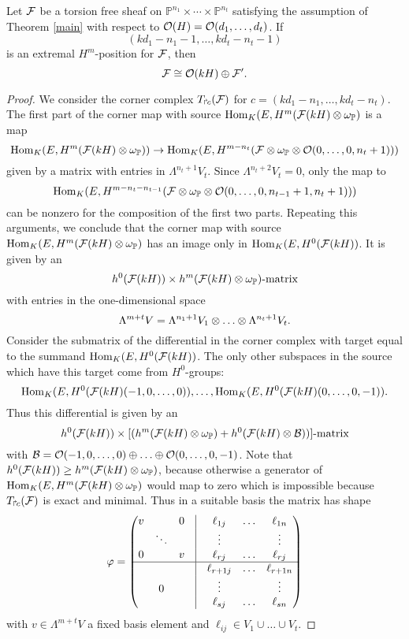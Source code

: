 \documentclass[twoside,12pt, leqno]{article}
\def\PP{{\mathbb P}}
\def\PPn{{\PP^{n_1} \times \cdots  \times \PP^{n_t}}}
\begin{document}
\begin{proposition}\label{summand}  Let ${\mathcal F}$ be a torsion free sheaf on $\PPn$ satisfying the assumption of Theorem \ref{main} with respect to
${\mathcal O}(H) = {\mathcal O}(d_1,\ldots,d_t)$. If $$(kd_1-n_1-1,\ldots,kd_t-n_t-1)$$ is an extremal $H^m$-position for ${\mathcal F}$, then
$$ {\mathcal F}\cong {\mathcal O}(kH) \oplus {\mathcal F}'.$$
\end{proposition}

\begin{proof}  We consider the corner complex $T_{\Rsh \kern -1pt c}({\mathcal F})$ for $c=(kd_1-n_1,\ldots,kd_t-n_t)$. The first part of the corner map
with source $\Hom_K(E,H^m(\sF(kH) \tensor \omega_\PP)$ is a map
$$
\Hom_K(E,H^m(\sF(kH) \tensor \omega_\PP)) \to \Hom_K(E,H^{m-n_t}(\sF\tensor \omega_\PP \tensor \sO(0,\ldots,0,n_t+1)))
$$
given by a matrix with entries in $\Lambda^{n_t+1} V_t$. Since $\Lambda^{n_t+2} V_t=0$, only the map to
$$
 \Hom_K(E,H^{m-n_t-n_{t-1}}(\sF\tensor \omega_\PP \tensor \sO(0,\ldots,0,n_{t-1}+1,n_t+1)))
$$
can be nonzero for the composition of the first two parts. Repeating this arguments, we conclude that the corner map with source 
$\Hom_K(E,H^m(\sF(kH) \tensor \omega_\PP)$ has an image only in $\operatorname{Hom}_K(E,H^0({\mathcal F}(kH))$. 
It is given by an
$$h^0(\sF(kH)) \times h^m(\sF(kH) \tensor \omega_\PP)\hbox{-matrix}$$ with entries in the one-dimensional space
$$\Lambda^{m+t} V =\Lambda^{n_1+1} V_1 \otimes \ldots \otimes \Lambda^{n_t+1} V_t.$$
Consider the submatrix of the differential in the corner complex with target equal to the summand $\operatorname{Hom}_K(E,H^0({\mathcal F}(kH))$. 
The only other subspaces in the source which have this target come from $H^0$-groups:
$$\operatorname{Hom}_K(E,H^0({\mathcal F}(kH)(-1,0,\ldots,0)), \ldots, \operatorname{Hom}_K(E,H^0({\mathcal F}(kH)(0,\ldots,0,-1)).$$
Thus this differential is given by an
$$h^0(\sF(kH)) \times [(h^m(\sF(kH)\tensor \omega_\PP) + h^0(\sF(kH)\otimes \sB) ) ]\hbox{-matrix} $$
with ${\mathcal B}= {\mathcal O}(-1,0,\ldots,0) \oplus \ldots \oplus {\mathcal O}(0,\ldots,0,-1)$.
Note that $h^0(\sF(kH)) \ge h^m(\sF(kH)\tensor \omega_\PP)$, because otherwise a generator of 
$\Hom_K(E,H^m(\sF(kH) \tensor \omega_\PP)$ would map to zero which is impossible because $T_{\Rsh \kern -1pt c}({\mathcal F})$ is exact and minimal. Thus in a suitable basis the matrix has shape
$$
\varphi=\begin{pmatrix}
v &         & 0 &\vrule &\ell_{1j} &\ldots & \ell_{1n}   \cr
   &\ddots &  &\vrule& \vdots   & & \vdots \cr
0 & & v & \vrule& \ell_{rj} & \ldots & \ell_{rj}   \cr \hline
  & &  &  \vrule&\ell_{r+1j} & \ldots & \ell_{r+1n}   \cr
 &0 & &   \vrule&\vdots   & & \vdots \cr
  & &  &  \vrule&\ell_{sj} & \ldots & \ell_{sn}   \cr
\end{pmatrix}
$$
with $v \in \Lambda^{m+t} V$ a fixed basis element and $ \ell_{ij} \in V_1 \cup \ldots \cup V_t$.


\end{proof}
\end{document}
